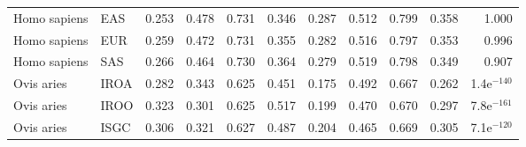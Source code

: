 \begin{longtable}{llrrrrrrrrr}
        Homo sapiens &                       EAS &                              0.253 &                               0.478 &                 0.731 &                 0.346 &                              0.287 &                               0.512 &                 0.799 &                 0.358 &         1.000 \\
        Homo sapiens &                       EUR &                              0.259 &                               0.472 &                 0.731 &                 0.355 &                              0.282 &                               0.516 &                 0.797 &                 0.353 &         0.996 \\
        Homo sapiens &                       SAS &                              0.266 &                               0.464 &                 0.730 &                 0.364 &                              0.279 &                               0.519 &                 0.798 &                 0.349 &         0.907 \\
          Ovis aries &                      IROA &                              0.282 &                               0.343 &                 0.625 &                 0.451 &                              0.175 &                               0.492 &                 0.667 &                 0.262 & 1.4e$^{-140}$ \\
          Ovis aries &                      IROO &                              0.323 &                               0.301 &                 0.625 &                 0.517 &                              0.199 &                               0.470 &                 0.670 &                 0.297 & 7.8e$^{-161}$ \\
          Ovis aries &                      ISGC &                              0.306 &                               0.321 &                 0.627 &                 0.487 &                              0.204 &                               0.465 &                 0.669 &                 0.305 & 7.1e$^{-120}$ \\
\end{longtable}
